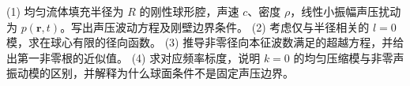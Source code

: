 (1) 均匀流体填充半径为 \(R\) 的刚性球形腔，声速 \(c\)、密度 \(\rho\)，线性小振幅声压扰动为 \(p(\mathbf r,t)\)。写出声压波动方程及刚壁边界条件。
(2) 考虑仅与半径相关的 \(l=0\) 模，求在球心有限的径向函数。
(3) 推导非零径向本征波数满足的超越方程，并给出第一非零根的近似值。
(4) 求对应频率标度，说明 \(k=0\) 的均匀压缩模与非零声振动模的区别，并解释为什么球面条件不是固定声压边界。
